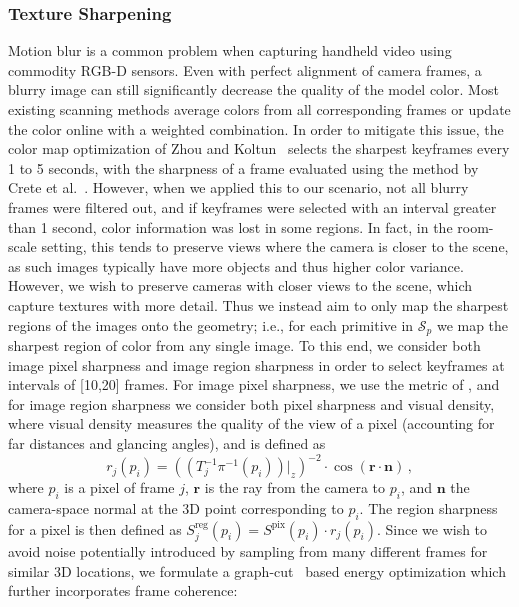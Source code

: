\subsubsection{Texture Sharpening}
\label{subsec:3dlite-color-sharp}
Motion blur is a common problem when capturing handheld video using commodity RGB-D sensors.
Even with perfect alignment of camera frames, a blurry image can still significantly decrease the quality of the model color. 
Most existing scanning methods average colors from all corresponding frames or update the color online with a weighted combination. 
In order to mitigate this issue, the color map optimization of Zhou and Koltun~\cite{zhou2014color} selects the sharpest keyframes every 1 to 5 seconds, with the sharpness of a frame evaluated using the method by Crete et al.~\cite{crete2007blur}. 
However, when we applied this to our scenario, not all blurry frames were filtered out, and if keyframes were selected with an interval greater than 1 second, color information was lost in some regions. 
In fact, in the room-scale setting, this tends to preserve views where the camera is closer to the scene, as such images typically have more objects and thus higher color variance.
However, we wish to preserve cameras with closer views to the scene, which capture textures with more detail.
Thus we instead aim to only map the sharpest regions of the images onto the geometry; i.e., for each primitive in $\mathcal{S}_p$ we map the sharpest region of color from any single image.
To this end, we consider both image pixel sharpness and image region sharpness in order to select keyframes at intervals of [10,20] frames.
For image pixel sharpness, we use the metric of \cite{vu2012bf}, and for image region sharpness we consider both pixel sharpness and visual density, where visual density measures the quality of the view of a pixel (accounting for far distances and glancing angles), and is defined as
\begin{equation}
r_j(p_i) = \left((T_j^{-1}\pi^{-1}(p_i))\big|_z\right)^{-2} \cdot \cos(\mathbf{r}\cdot \mathbf{n})\,,
\label{eq:visual-res}
\end{equation}
where $p_i$ is a pixel of frame $j$, $\mathbf{r}$ is the ray from the camera to $p_i$, and $\mathbf{n}$ the camera-space normal at the 3D point corresponding to $p_i$.
The region sharpness for a pixel is then defined as $S^{\textrm{reg}}_j(p_i)=S^{\textrm{pix}}(p_i)\cdot r_j(p_i)$. 
Since we wish to avoid noise potentially introduced by sampling from many different frames for similar 3D locations, we formulate a graph-cut~\cite{boykov2001fast} based energy optimization which further incorporates frame coherence:
